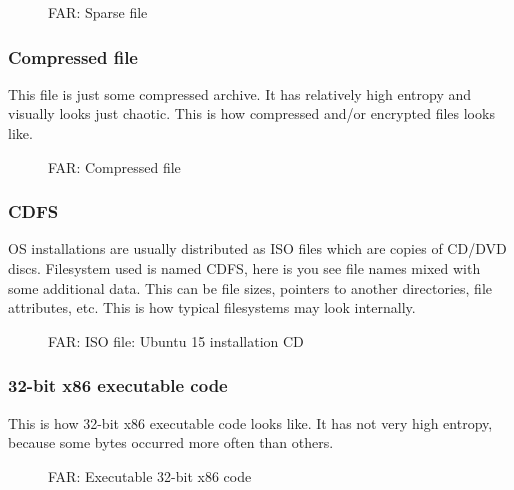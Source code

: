 \begin{figure}[H]
\centering
{}
\caption{FAR: Sparse file}
\end{figure}

\clearpage
\subsubsection{Compressed file}

This file is just some compressed archive.
It has relatively high entropy and visually looks just chaotic.
This is how compressed and/or encrypted files looks like.

\begin{figure}[H]
\centering
{}
\caption{FAR: Compressed file}
\end{figure}

\clearpage
\subsubsection{\ac{CDFS}}

\ac{OS} installations are usually distributed as ISO files which are copies of CD/DVD discs.
Filesystem used is named \ac{CDFS}, here is you see file names mixed with some additional data.
This can be file sizes, pointers to another directories, file attributes, etc.
This is how typical filesystems may look internally.

\begin{figure}[H]
\centering
{}
\caption{FAR: ISO file: Ubuntu 15 installation \ac{CD}}
\end{figure}

\clearpage
\subsubsection{32-bit x86 executable code}

This is how 32-bit x86 executable code looks like.
It has not very high entropy, because some bytes occurred more often than others.

\begin{figure}[H]
\centering
{}
\caption{FAR: Executable 32-bit x86 code}
\end{figure}


